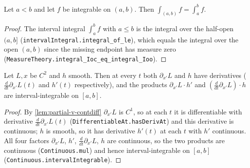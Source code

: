 \begin{lemma}
    \label{lem:ioo-interval-conversion}
    \leanok
    Let $a < b$ and let $f$ be integrable on $(a,b)$. Then
    $\int_{(a,b)} f = \int_a^b f$.
\end{lemma}
\begin{proof}
    The interval integral $\int_a^b f$ with $a \le b$ is the integral over the
    half-open $(a,b]$ (\texttt{intervalIntegral.integral\_of\_le}), which equals
    the integral over the open $(a,b)$ since the missing endpoint has measure
    zero (\texttt{MeasureTheory.integral\_Ioc\_eq\_integral\_Ioo}).
\end{proof}

\begin{lemma}
    \label{lem:ibp-hypotheses}
    \leanok
    Let $L, x$ be $C^2$ and $h$ smooth. Then at every $t$ both $\partial_{x'} L$
    and $h$ have derivatives ($\tfrac{d}{dt}\partial_{x'} L(t)$ and $h'(t)$
    respectively), and the products $\partial_{x'} L \cdot h'$ and
    $(\tfrac{d}{dt}\partial_{x'} L)\cdot h$ are interval-integrable on $[a,b]$.
\end{lemma}
\begin{proof}
    By \cref{lem:partial-v-contdiff} $\partial_{x'} L$ is $C^1$, so at each $t$ it
    is differentiable with derivative $\tfrac{d}{dt}\partial_{x'} L(t)$
    (\texttt{DifferentiableAt.hasDerivAt}) and this derivative is continuous;
    $h$ is smooth, so it has derivative $h'(t)$ at each $t$ with $h'$ continuous.
    All four factors $\partial_{x'} L$, $h'$, $\tfrac{d}{dt}\partial_{x'} L$, $h$
    are continuous, so the two products are continuous
    (\texttt{Continuous.mul}) and hence interval-integrable on $[a,b]$
    (\texttt{Continuous.intervalIntegrable}).
\end{proof}

